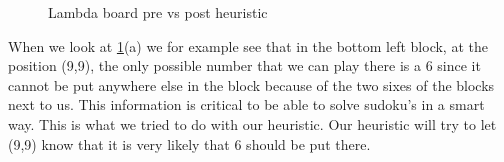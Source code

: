 \documentclass{report}
\begin{document}
\begin{figure}[h]
    \centering
    \qquad
    \caption{Lambda board pre vs post heuristic}%
    \label{fig:classic_heuristic}%
\end{figure}
When we look at \ref{fig:classic_heuristic}(a) we for example see that in the bottom left block, at the position (9,9), the only possible number that we can play there is a 6 since it cannot be put anywhere else in the block because of the two sixes of the blocks next to us. This information is critical to be able to solve sudoku's in a smart way. This is what we tried to do with our heuristic. Our heuristic will try to let (9,9) know that it is very likely that 6 should be put there. 
\newline
\newline
\newline
\end{document}
